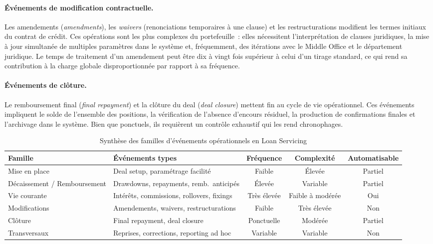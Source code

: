 \paragraph{Événements de modification contractuelle.}
Les amendements (\textit{amendments}), les \textit{waivers} (renonciations temporaires à une clause) et les restructurations modifient les termes initiaux du contrat de crédit. Ces opérations sont les plus complexes du portefeuille~: elles nécessitent l'interprétation de clauses juridiques, la mise à jour simultanée de multiples paramètres dans le système et, fréquemment, des itérations avec le Middle Office et le département juridique. Le temps de traitement d'un amendement peut être dix à vingt fois supérieur à celui d'un tirage standard, ce qui rend sa contribution à la charge globale disproportionnée par rapport à sa fréquence.

\paragraph{Événements de clôture.}
Le remboursement final (\textit{final repayment}) et la clôture du deal (\textit{deal closure}) mettent fin au cycle de vie opérationnel. Ces événements impliquent le solde de l'ensemble des positions, la vérification de l'absence d'encours résiduel, la production de confirmations finales et l'archivage dans le système. Bien que ponctuels, ils requièrent un contrôle exhaustif qui les rend chronophages.

\begin{table}[htbp]
\centering
\caption{Synthèse des familles d'événements opérationnels en Loan Servicing}
\label{tab:typologie-evenements}
\renewcommand{\arraystretch}{1.35}
\small
\begin{tabular}{@{} p{2.6cm} p{3.6cm} c c c @{}}
\toprule
\textbf{Famille} & \textbf{Événements types} & \textbf{Fréquence} & \textbf{Complexité} & \textbf{Automatisable} \\
\midrule
Mise en place & Deal setup, paramétrage facilité & Faible & Élevée & Partiel \\
Décaissement / Remboursement & Drawdowns, repayments, remb.\ anticipés & Élevée & Variable & Partiel \\
Vie courante & Intérêts, commissions, rollovers, fixings & Très élevée & Faible à modérée & Oui \\
Modifications & Amendements, waivers, restructurations & Faible & Très élevée & Non \\
Clôture & Final repayment, deal closure & Ponctuelle & Modérée & Partiel \\
\addlinespace
\rowcolor{gray!10}
Transversaux & Reprises, corrections, reporting ad hoc & Variable & Variable & Non \\
\bottomrule
\end{tabular}
\end{table}

